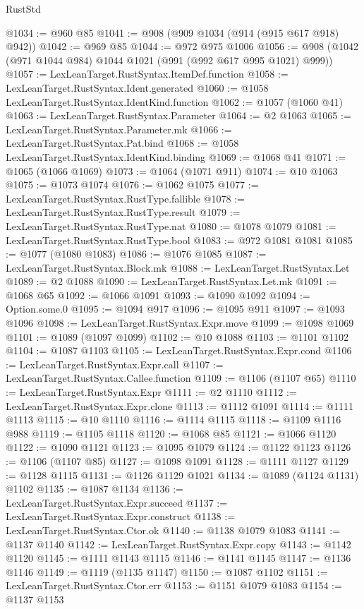 \begin{lexlean}{RustStd}
\begin{coremodule}
{\begin{coremodule}
{{{{{{{{{{{{{{{{{{{{{{{{{{@1034 := @960 @85
@1041 := @908 (@909 @1034 (@914 (@915 @617 @918) @942))
@1042 := @969 @85
@1044 := @972 @975 @1006
@1056 := @908 (@1042 (@971 @1044 @984) @1044 @1021 (@991 (@992 @617 @995 @1021) @999))
@1057 := LexLeanTarget.RustSyntax.ItemDef.function
@1058 := LexLeanTarget.RustSyntax.Ident.generated
@1060 := @1058 LexLeanTarget.RustSyntax.IdentKind.function
@1062 := @1057 (@1060 @41)
@1063 := LexLeanTarget.RustSyntax.Parameter
@1064 := @2 @1063
@1065 := LexLeanTarget.RustSyntax.Parameter.mk
@1066 := LexLeanTarget.RustSyntax.Pat.bind
@1068 := @1058 LexLeanTarget.RustSyntax.IdentKind.binding
@1069 := @1068 @41
@1071 := @1065 (@1066 @1069)
@1073 := @1064 (@1071 @911)
@1074 := @10 @1063
@1075 := @1073 @1074
@1076 := @1062 @1075
@1077 := LexLeanTarget.RustSyntax.RustType.fallible
@1078 := LexLeanTarget.RustSyntax.RustType.result
@1079 := LexLeanTarget.RustSyntax.RustType.nat
@1080 := @1078 @1079
@1081 := LexLeanTarget.RustSyntax.RustType.bool
@1083 := @972 @1081 @1081
@1085 := @1077 (@1080 @1083)
@1086 := @1076 @1085
@1087 := LexLeanTarget.RustSyntax.Block.mk
@1088 := LexLeanTarget.RustSyntax.Let
@1089 := @2 @1088
@1090 := LexLeanTarget.RustSyntax.Let.mk
@1091 := @1068 @65
@1092 := @1066 @1091
@1093 := @1090 @1092
@1094 := Option.some.{0}
@1095 := @1094 @917
@1096 := @1095 @911
@1097 := @1093 @1096
@1098 := LexLeanTarget.RustSyntax.Expr.move
@1099 := @1098 @1069
@1101 := @1089 (@1097 @1099)
@1102 := @10 @1088
@1103 := @1101 @1102
@1104 := @1087 @1103
@1105 := LexLeanTarget.RustSyntax.Expr.cond
@1106 := LexLeanTarget.RustSyntax.Expr.call
@1107 := LexLeanTarget.RustSyntax.Callee.function
@1109 := @1106 (@1107 @65)
@1110 := LexLeanTarget.RustSyntax.Expr
@1111 := @2 @1110
@1112 := LexLeanTarget.RustSyntax.Expr.clone
@1113 := @1112 @1091
@1114 := @1111 @1113
@1115 := @10 @1110
@1116 := @1114 @1115
@1118 := @1109 @1116 @988
@1119 := @1105 @1118
@1120 := @1068 @85
@1121 := @1066 @1120
@1122 := @1090 @1121
@1123 := @1095 @1079
@1124 := @1122 @1123
@1126 := @1106 (@1107 @85)
@1127 := @1098 @1091
@1128 := @1111 @1127
@1129 := @1128 @1115
@1131 := @1126 @1129 @1021
@1134 := @1089 (@1124 @1131) @1102
@1135 := @1087 @1134
@1136 := LexLeanTarget.RustSyntax.Expr.succeed
@1137 := LexLeanTarget.RustSyntax.Expr.construct
@1138 := LexLeanTarget.RustSyntax.Ctor.ok
@1140 := @1138 @1079 @1083
@1141 := @1137 @1140
@1142 := LexLeanTarget.RustSyntax.Expr.copy
@1143 := @1142 @1120
@1145 := @1111 @1143 @1115
@1146 := @1141 @1145
@1147 := @1136 @1146
@1149 := @1119 (@1135 @1147)
@1150 := @1087 @1102
@1151 := LexLeanTarget.RustSyntax.Ctor.err
@1153 := @1151 @1079 @1083
@1154 := @1137 @1153
}}}}}}}}}}}}}}}}}}}}}}}}}}
\end{coremodule}}
\end{coremodule}
\end{lexlean}
